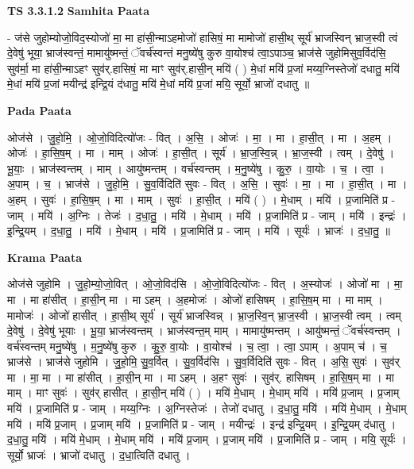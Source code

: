 \documentclass[17pt]{extarticle}
\begin{document}
\textbf{TS 3.3.1.2 } \newline
\textbf{Samhita Paata} \newline

- ज॑से जुहोम्योजो॒विद॒स्योजो॑ मा॒ मा हा॑सी॒न्माऽहमोजो॑ हासिषं॒ मा मामोजो॑ हासी॒थ् सूर्य॑ भ्राजस्विन् भ्राज॒स्वी त्वं दे॒वेषु॑ भूया॒ भ्राज॑स्वन्तं॒ मामायु॑ष्मन्तं॒ ॅवर्च॑स्वन्तं मनु॒ष्ये॑षु कुरु वा॒योश्च॑ त्वा॒ऽपाञ्च॒ भ्राज॑से जुहोमिसुव॒र्विद॑सि॒ सुव॑र्मा॒ मा हा॑सी॒न्माऽहꣳ सुव॑र्.हासिषं॒ मा माꣳ सुव॑र्.हासी॒न् मयि॑ ( ) मे॒धां मयि॑ प्र॒जां मय्य॒ग्निस्तेजो॑ दधातु॒ मयि॑ मे॒धां मयि॑ प्र॒जां मयीन्द्र॑ इन्द्रि॒यं द॑धातु॒ मयि॑ मे॒धां मयि॑ प्र॒जां मयि॒ सूर्यो॒ भ्राजो॑ दधातु ॥ \newline

\textbf{Pada Paata} \newline

ओज॑से । जु॒हो॒मि॒ । ओ॒जो॒विदित्यो॑जः - वित् । अ॒सि॒ । ओजः॑ । मा॒ । मा । हा॒सी॒त् । मा । अ॒हम् । ओजः॑ । हा॒सि॒ष॒म् । मा । माम् । ओजः॑ । हा॒सी॒त् । सूर्य॑ । भ्रा॒ज॒स्वि॒न्न् । भ्रा॒ज॒स्वी । त्वम् । दे॒वेषु॑ । भू॒याः॒ । भ्राज॑स्वन्तम् । माम् । आयु॑ष्मन्तम् । वर्च॑स्वन्तम् । म॒नु॒ष्ये॑षु । कु॒रु॒ । वा॒योः । च॒ । त्वा॒ । अ॒पाम् । च॒ । भ्राज॑से । जु॒हो॒मि॒ । सु॒व॒र्विदिति॑ सुवः - वित् । अ॒सि॒ । सुवः॑ । मा॒ । मा । हा॒सी॒त् । मा । अ॒हम् । सुवः॑ । हा॒सि॒ष॒म् । मा । माम् । सुवः॑ । हा॒सी॒त् । मयि॑ ( ) । मे॒धाम् । मयि॑ । प्र॒जामिति॑ प्र - जाम् । मयि॑ । अ॒ग्निः । तेजः॑ । द॒धा॒तु॒ । मयि॑ । मे॒धाम् । मयि॑ । प्र॒जामिति॑ प्र - जाम् । मयि॑ । इन्द्रः॑ । इ॒न्द्रि॒यम् । द॒धा॒तु॒ । मयि॑ । मे॒धाम् । मयि॑ । प्र॒जामिति॑ प्र - जाम् । मयि॑ । सूर्यः॑ । भ्राजः॑ । द॒धा॒तु॒ ॥  \newline


\textbf{Krama Paata} \newline

ओज॑से जुहोमि । जु॒हो॒म्यो॒जो॒वित् । ओ॒जो॒विद॑सि । ओ॒जो॒विदित्यो॑जः - वित् । अ॒स्योजः॑ । ओजो॑ मा । मा॒ मा । मा हा॑सीत् । हा॒सी॒न् मा । मा ऽहम् । अ॒हमोजः॑ । ओजो॑ हासिषम् । हा॒सि॒ष॒म् मा । मा माम् । मामोजः॑ । ओजो॑ हासीत् । हा॒सी॒थ् सूर्य॑ । सूर्य॑ भ्राजस्विन्न् । भ्रा॒ज॒स्वि॒न् भ्रा॒ज॒स्वी । भ्रा॒ज॒स्वी त्वम् । त्वम् दे॒वेषु॑ । दे॒वेषु॑ भूयाः । भू॒या॒ भ्राज॑स्वन्तम् । भ्राज॑स्वन्त॒म् माम् । मामायु॑ष्मन्तम् । आयु॑ष्मन्तं॒ ॅवर्च॑स्वन्तम् । वर्च॑स्वन्तम् मनु॒ष्ये॑षु । म॒नु॒ष्ये॑षु कुरु । कु॒रु॒ वा॒योः । वा॒योश्च॑ । च॒ त्वा॒ । त्वा॒ ऽपाम् । अ॒पाम् च॑ । च॒ भ्राज॑से । भ्राज॑से जुहोमि । जु॒हो॒मि॒ सु॒व॒र्वित् । सु॒व॒र्विद॑सि । सु॒व॒र्विदिति॑ सुवः - वित् । अ॒सि॒ सुवः॑ । सुव॑र् मा । मा॒ मा । मा हा॑सीत् । हा॒सी॒न् मा । मा ऽहम् । अ॒हꣳ सुवः॑ । सुव॑र्. हासिषम् । हा॒सि॒ष॒म् मा । मा माम् । माꣳ सुवः॑ । सुव॑र् हासीत् । हा॒सी॒न् मयि॑ ( ) । मयि॑ मे॒धाम् । मे॒धाम् मयि॑ । मयि॑ प्र॒जाम् । प्र॒जाम् मयि॑ । प्र॒जामिति॑ प्र - जाम् । मय्य॒ग्निः । अ॒ग्निस्तेजः॑ । तेजो॑ दधातु । द॒धा॒तु॒ मयि॑ । मयि॑ मे॒धाम् । मे॒धाम् मयि॑ । मयि॑ प्र॒जाम् । प्र॒जाम् मयि॑ । प्र॒जामिति॑ प्र - जाम् । मयीन्द्रः॑ । इन्द्र॑ इन्द्रि॒यम् । इ॒न्द्रि॒यम् द॑धातु । द॒धा॒तु॒ मयि॑ । मयि॑ मे॒धाम् । मे॒धाम् मयि॑ । मयि॑ प्र॒जाम् । प्र॒जाम् मयि॑ । प्र॒जामिति॑ प्र - जाम् । मयि॒ सूर्यः॑ । सूर्यो॒ भ्राजः॑ । भ्राजो॑ दधातु । द॒धा॒त्विति॑ दधातु । \newline
\end{document}
